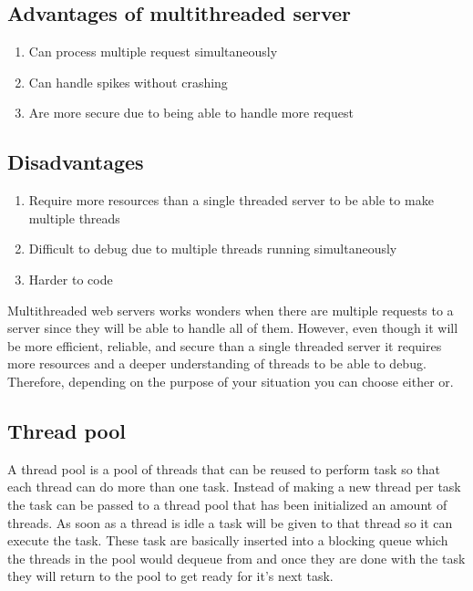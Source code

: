 \documentclass[conference]{IEEEtran}
\begin{document}
\subsection*{Advantages of multithreaded server}
\begin{enumerate}
	\item Can process multiple request simultaneously
	\item Can handle spikes  without crashing
	\item Are more secure due to being able to handle more request
\end{enumerate}
\subsection*{Disadvantages}
\begin{enumerate}
	\item Require more resources than a single threaded server to  be able to make multiple threads
	\item Difficult to debug due to multiple threads running simultaneously
	\item Harder to code
\end{enumerate}
Multithreaded web servers works wonders when there are multiple requests to a server since they will be able to handle all of them. However, even  though it will be more efficient, reliable, and secure than  a single threaded server it requires more resources and a deeper understanding of threads to be able to debug. Therefore, depending on the purpose of your situation you can choose either or.
\subsection*{Thread pool}
A thread pool is a pool of threads that can be reused to perform task so that each thread can  do more than one task. Instead of making a new thread per task the task can be  passed to a thread pool that has been initialized an amount of threads. As soon as a thread is idle a task will be given to that thread so it can execute the task. These task are basically inserted into a blocking queue which the threads in the pool would dequeue from and once they are done with the task they will return to the pool to get ready for it’s next task.
\end{document}
